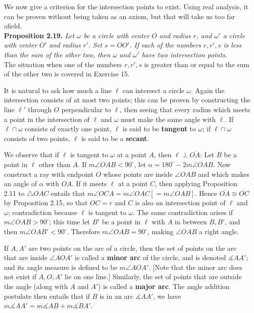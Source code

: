 \documentclass[leqno]{book}
\begin{document}
We now give a criterion for the intersection points to exist.  Using real analysis, it can be proven without being taken as an axiom, but that will take us too far afield.\\

\noindent\textbf{Proposition 2.19.} \emph{Let $\omega$ be a circle with center $O$ and radius $r$, and $\omega'$ a circle with center $O'$ and radius $r'$.  Set $s=OO'$.  If each of the numbers $r,r',s$ is less than the sum of the other two, then $\omega$ and $\omega'$ have two intersection points.}\\

\noindent The situation when one of the numbers $r,r',s$ is greater than or equal to the sum of the other two is covered in Exercise 15.

It is natural to ask how much a line $\ell$ can intersect a circle $\omega$.  Again the intersection consists of at most two points; this can be proven by constructing the line $\ell'$ through $O$ perpendicular to $\ell$, then seeing that every radius which meets a point in the intersection of $\ell$ and $\omega$ must make the same angle with $\ell$.  If $\ell\cap\omega$ consists of exactly one point, $\ell$ is said to be \textbf{tangent} to $\omega$; if $\ell\cap\omega$ consists of two points, $\ell$ is said to be a \textbf{secant}.

We observe that if $\ell$ is tangent to $\omega$ at a point $A$, then $\ell\perp\overline{OA}$: Let $B$ be a point in $\ell$ other than $A$.  If $m\angle OAB<90^\circ$, let $\alpha=180^\circ-2m\angle OAB$.  Now construct a ray with endpoint $O$ whose points are inside $\angle OAB$ and which makes an angle of $\alpha$ with $\overline{OA}$.  If it meets $\ell$ at a point $C$, then applying Proposition 2.11 to $\triangle OAC$ entails that $m\angle OCA=m\angle OAC[=m\angle OAB]$.  Hence $\overline{OA}\cong\overline{OC}$ by Proposition 2.15, so that $OC=r$ and $C$ is also an intersection point of $\ell$ and $\omega$; contradiction because $\ell$ is tangent to $\omega$.  The same contradiction arises if $m\angle OAB>90^\circ$; this time let $B'$ be a point in $\ell$ with $A$ in between $B,B'$, and then $m\angle OAB'<90^\circ$.  Therefore $m\angle OAB=90^\circ$, making $\angle OAB$ a right angle.

If $A,A'$ are two points on the arc of a circle, then the set of points on the arc that are inside $\angle AOA'$ is called a \textbf{minor arc} of the circle, and is denoted $\measuredangle AA'$; and its angle measure is defined to be $m\angle AOA'$.  [Note that the minor arc does not exist if $A,O,A'$ lie on one line.]  Similarly, the set of points that are outside the angle (along with $A$ and $A'$) is called a \textbf{major arc}.  The angle addition postulate then entails that if $B$ is in an arc $\measuredangle AA'$, we have $m\measuredangle AA'=m\measuredangle AB+m\measuredangle BA'$.
\end{document}
